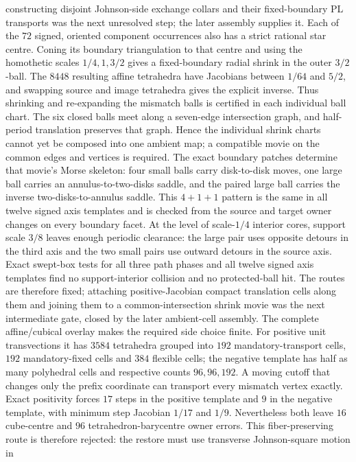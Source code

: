 \documentclass[11pt]{amsart}
\theoremstyle{definition}
\theoremstyle{remark}
\begin{document}
constructing disjoint Johnson-side exchange collars and their fixed-boundary
PL transports was the next unresolved step; the later assembly supplies it.
Each of the $72$ signed, oriented component occurrences also has a strict
rational star centre.  Coning its boundary triangulation to that centre and
using the homothetic scales $1/4,1,3/2$ gives a fixed-boundary radial shrink in
the outer $3/2$-ball.  The $8448$ resulting affine tetrahedra have Jacobians
between $1/64$ and $5/2$, and swapping source and image tetrahedra gives the
explicit inverse.  Thus shrinking and re-expanding the mismatch balls is
certified in each individual ball chart.  The six closed balls meet along a
seven-edge intersection graph, and half-period translation preserves that
graph.  Hence the individual shrink charts cannot yet be composed into one
ambient map; a compatible movie on the common edges and vertices is required.
The exact boundary patches determine that movie's Morse skeleton: four small
balls carry disk-to-disk moves, one large ball carries an
annulus-to-two-disks saddle, and the paired large ball carries the inverse
two-disks-to-annulus saddle.  This $4+1+1$ pattern is the same in all twelve
signed axis templates and is checked from the source and target owner changes
on every boundary facet.
At the level of scale-$1/4$ interior cores, support scale $3/8$ leaves
enough periodic clearance: the large pair uses opposite detours in the third
axis and the two small pairs use outward detours in the source axis.  Exact
swept-box tests for all three path phases and all twelve signed axis templates
find no support-interior collision and no protected-ball hit.  The routes are
therefore fixed; attaching positive-Jacobian compact translation cells along
them and joining them to a common-intersection shrink movie was the next
intermediate gate, closed by the later ambient-cell assembly.
The complete affine/cubical overlay makes the required side choice finite.
For positive unit transvections it has $3584$ tetrahedra grouped into $192$
mandatory-transport cells, $192$ mandatory-fixed cells and $384$ flexible
cells; the negative template has half as many polyhedral cells and respective
counts $96,96,192$.  A moving cutoff that changes only the prefix coordinate
can transport every mismatch vertex exactly.  Exact positivity forces $17$
steps in the positive template and $9$ in the negative template, with minimum
step Jacobian $1/17$ and $1/9$.  Nevertheless both leave $16$ cube-centre and
$96$ tetrahedron-barycentre owner errors.  This fiber-preserving route is
therefore rejected: the restore must use transverse Johnson-square motion in
\end{document}

